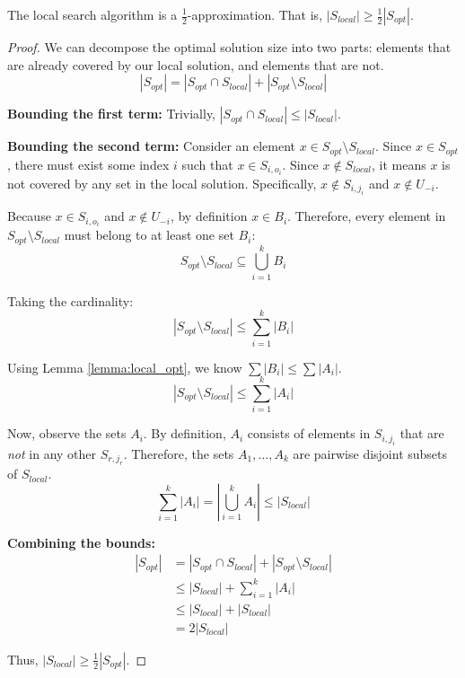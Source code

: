 \begin{theorem}
The local search algorithm is a $\frac{1}{2}$-approximation. That is, $|S_{local}| \ge \frac{1}{2} |S_{opt}|$.
\end{theorem}

\begin{proof}
We can decompose the optimal solution size into two parts: elements that are already covered by our local solution, and elements that are not.
\[ |S_{opt}| = |S_{opt} \cap S_{local}| + |S_{opt} \setminus S_{local}| \]

\textbf{Bounding the first term:}
Trivially, $|S_{opt} \cap S_{local}| \le |S_{local}|$.

\textbf{Bounding the second term:}
Consider an element $x \in S_{opt} \setminus S_{local}$.
Since $x \in S_{opt}$, there must exist some index $i$ such that $x \in S_{i, o_i}$.
Since $x \notin S_{local}$, it means $x$ is not covered by any set in the local solution. Specifically, $x \notin S_{i, j_i}$ and $x \notin U_{-i}$.

Because $x \in S_{i, o_i}$ and $x \notin U_{-i}$, by definition $x \in B_i$.
Therefore, every element in $S_{opt} \setminus S_{local}$ must belong to at least one set $B_i$:
\[ S_{opt} \setminus S_{local} \subseteq \bigcup_{i=1}^k B_i \]

Taking the cardinality:
\[ |S_{opt} \setminus S_{local}| \le \sum_{i=1}^k |B_i| \]

Using Lemma \ref{lemma:local_opt}, we know $\sum |B_i| \le \sum |A_i|$.
\[ |S_{opt} \setminus S_{local}| \le \sum_{i=1}^k |A_i| \]

Now, observe the sets $A_i$. By definition, $A_i$ consists of elements in $S_{i, j_i}$ that are \textit{not} in any other $S_{r, j_r}$. Therefore, the sets $A_1, \dots, A_k$ are pairwise disjoint subsets of $S_{local}$.
\[ \sum_{i=1}^k |A_i| = \left| \bigcup_{i=1}^k A_i \right| \le |S_{local}| \]

\textbf{Combining the bounds:}
\begin{align*}
    |S_{opt}| &= |S_{opt} \cap S_{local}| + |S_{opt} \setminus S_{local}| \\
    &\le |S_{local}| + \sum_{i=1}^k |A_i| \\
    &\le |S_{local}| + |S_{local}| \\
    &= 2 |S_{local}|
\end{align*}

Thus, $|S_{local}| \ge \frac{1}{2} |S_{opt}|$.
\end{proof}

